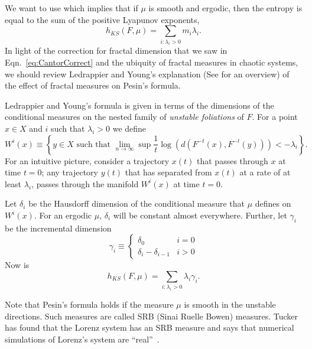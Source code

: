 We want to use \cite{pesin77} which implies
that if $\mu$ is smooth and ergodic, then the entropy is equal to the
sum of the positive Lyapunov exponents, \ie
\begin{equation}
  \label{eq:pesin}
  h_{KS}(F,\mu) = \sum_{i:\lambda_i >0} m_i \lambda_i.
\end{equation}
In light of the correction for fractal dimension that we saw in
Eqn.~\eqref{eq:CantorCorrect} and the ubiquity of fractal measures in
chaotic systems, we should review Ledrappier and Young's explanation
(See \cite{young95-1} for an overview) of the effect of fractal
measures on Pesin's formula.

Ledrappier and Young's formula is given in terms of the dimensions of
the conditional measures on the nested family of \emph{unstable
  foliations} of $F$.  For a point $x\in X$ and $i$ such that
$\lambda_i>0$ we define
\begin{equation}
  \label{eq:Foliation}
  W^i(x) \equiv \left\{ y \in X \text{ such that } \lim_{n \rightarrow
  \infty} \sup \frac{1}{t} \log \left( d\left( F^{-t}(x), F^{-t}(y)
  \right) \right) <
  -\lambda_i \right\}.
\end{equation}
For an intuitive picture, consider a trajectory $x(t)$ that passes
through $x$ at time $t=0$; any trajectory $y(t)$ that has separated
from $x(t)$ at a rate of at least $\lambda_i$, passes through the
manifold $W^i(x)$ at time $t=0$.

Let $\delta_i$ be the Hausdorff dimension of the conditional measure
that $\mu$ defines on $W^i(x)$.  For an ergodic $\mu$, $\delta_i$ will
be constant almost everywhere.  Further, let $\gamma_i$ be the
incremental dimension
\begin{equation*}
  \gamma_i \equiv
  \begin{cases}
    \delta_0 & i=0\\
    \delta_i - \delta_{i-1} & i > 0
  \end{cases}
\end{equation*}
Now  is
\begin{equation}
  \label{eq:Ledrappier}
  h_{KS}(F,\mu) = \sum_{i : \lambda_i > 0} \lambda_i \gamma_i.
\end{equation}

Note that Pesin's formula holds if the measure $\mu$ is smooth in the
unstable directions.  Such measures are called SRB (Sinai Ruelle
Bowen) measures.   Tucker has found that the Lorenz
system has an SRB measure and says that numerical simulations of
Lorenz's system are ``real''~\cite{tucker99}.

